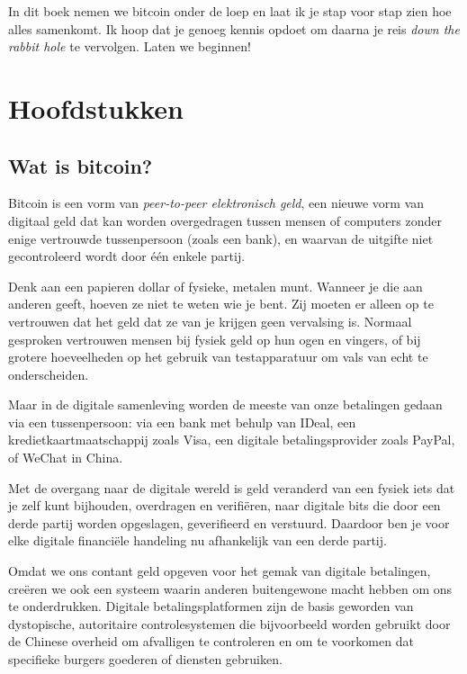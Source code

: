 \documentclass[
  letterpaper,
]{scrbook}
\begin{document}
In dit boek nemen we bitcoin onder de loep en laat ik je stap voor stap
zien hoe alles samenkomt. Ik hoop dat je genoeg kennis opdoet om daarna
je reis \emph{down the rabbit hole} te vervolgen. Laten we beginnen!

\part{Hoofdstukken}

\hypertarget{wat-is-bitcoin}{%
\chapter{Wat is bitcoin?}\label{wat-is-bitcoin}}

Bitcoin is een vorm van \emph{peer-to-peer elektronisch geld}, een
nieuwe vorm van digitaal geld dat kan worden overgedragen tussen mensen
of computers zonder enige vertrouwde tussenpersoon (zoals een bank), en
waarvan de uitgifte niet gecontroleerd wordt door één enkele partij.

Denk aan een papieren dollar of fysieke, metalen munt. Wanneer je die
aan anderen geeft, hoeven ze niet te weten wie je bent. Zij moeten er
alleen op te vertrouwen dat het geld dat ze van je krijgen geen
vervalsing is. Normaal gesproken vertrouwen mensen bij fysiek geld op
hun ogen en vingers, of bij grotere hoeveelheden op het gebruik van
testapparatuur om vals van echt te onderscheiden.

Maar in de digitale samenleving worden de meeste van onze betalingen
gedaan via een tussenpersoon: via een bank met behulp van IDeal, een
kredietkaartmaatschappij zoals Visa, een digitale betalingsprovider
zoals PayPal, of WeChat in China.

Met de overgang naar de digitale wereld is geld veranderd van een fysiek
iets dat je zelf kunt bijhouden, overdragen en verifiëren, naar digitale
bits die door een derde partij worden opgeslagen, geverifieerd en
verstuurd. Daardoor ben je voor elke digitale financiële handeling nu
afhankelijk van een derde partij.

Omdat we ons contant geld opgeven voor het gemak van digitale
betalingen, creëren we ook een systeem waarin anderen buitengewone macht
hebben om ons te onderdrukken. Digitale betalingsplatformen zijn de
basis geworden van dystopische, autoritaire controlesystemen die
bijvoorbeeld worden gebruikt door de Chinese overheid om afvalligen te
controleren en om te voorkomen dat specifieke burgers goederen of
diensten gebruiken.
\end{document}
